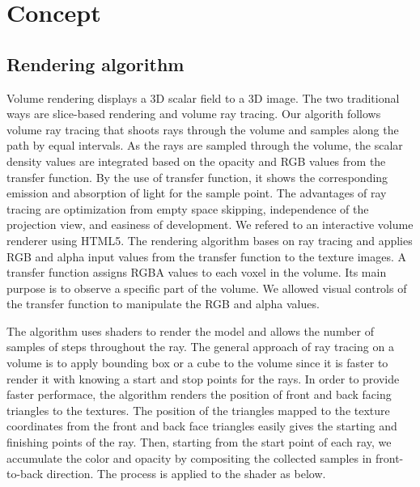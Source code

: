 \documentclass{acm_proc_article-sp}
\begin{document}
\section{Concept}
\subsection{Rendering algorithm}

Volume rendering displays a 3D scalar field to a 3D image. The two traditional ways are slice-based rendering and volume ray tracing. Our algorith follows volume ray tracing that shoots rays through the volume and samples along the path by equal intervals. As the rays are sampled through the volume, the scalar density values are integrated based on the opacity and RGB values from the transfer function. By the use of transfer function, it shows the corresponding emission and absorption of light for the sample point. The advantages of ray tracing are optimization from empty space skipping, independence of the projection view, and easiness of development.
We refered to an interactive volume renderer using HTML5. The rendering algorithm bases on ray tracing and applies RGB and alpha input values from the transfer function to the texture images. A transfer function assigns RGBA values to each voxel in the volume. Its main purpose is to observe a specific part of the volume. We allowed visual controls of the transfer function to manipulate the RGB and alpha values. 

The algorithm uses shaders to render the model and allows the number of samples of steps throughout the ray. The general approach of ray tracing on a volume is to apply bounding box or a cube to the volume since it is faster to render it with knowing a start and stop points for the rays. In order to provide faster performace, the algorithm renders the position of front and back facing triangles to the textures. The position of the triangles mapped to the texture coordinates from the front and back face triangles easily gives the starting and finishing points of the ray. Then, starting from the start point of each ray, we accumulate the color and opacity by compositing the collected samples in front-to-back direction. The process is applied to the shader as below.
\end{document}
